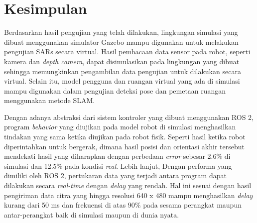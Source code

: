\section{Kesimpulan}
\label{sec:kesimpulan}

Berdasarkan hasil pengujian yang telah dilakukan,
  lingkungan simulasi yang dibuat menggunakan simulator Gazebo mampu digunakan untuk melakukan pengujian SARs secara virtual.
Hasil pembacaan data sensor pada robot, seperti kamera dan \emph{depth camera},
  dapat disimulasikan pada lingkungan yang dibuat sehingga memungkinkan pengambilan data pengujian untuk dilakukan secara virtual.
Selain itu, model pengguna dan ruangan virtual yang ada di simulasi mampu digunakan dalam pengujian deteksi pose dan pemetaan ruangan menggunakan metode SLAM.

Dengan adanya abstraksi dari sistem kontroler yang dibuat menggunakan ROS 2,
  program \emph{behavior} yang diujikan pada model robot di simulasi menghasilkan tindakan yang sama ketika diujikan pada robot fisik.
Seperti hasil ketika robot diperintahkan untuk bergerak,
  dimana hasil posisi dan orientasi akhir tersebut mendekati hasil yang diharapkan dengan perbedaan \emph{error} sebesar 2.6\% di simulasi dan 12.5\% pada kondisi \emph{real}.
Lebih lanjut, Dengan performa yang dimiliki oleh ROS 2,
  pertukaran data yang terjadi antara program dapat dilakukan secara \emph{real-time} dengan \emph{delay} yang rendah.
Hal ini sesuai dengan hasil pengiriman data citra yang hingga resolusi 640 x 480 mampu menghasilkan \emph{delay} kurang dari 50 ms dan frekuensi di atas 90\% pada sesama perangkat maupun antar-perangkat baik di simulasi maupun di dunia nyata.
